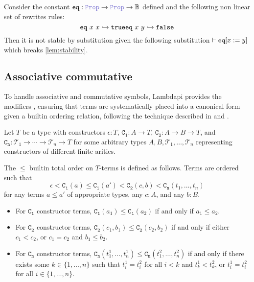 \begin{example}
Consider the constant $\kw{eq}: \prop \ra \prop \ra \B$ defined  and the following non linear set of rewrites rules:
\[
    \texttt{\upshape{eq}}~x~x \hookrightarrow \texttt{\upshape{true}}\\
    \texttt{\upshape{eq}}~x~y \hookrightarrow \texttt{\upshape{false}}
\]
Then it is not stable by substitution given the following substitution $\vdash\texttt{\upshape{eq}}[x := y]$ which breaks \cref{lem:stability}.
\end{example}

\subsection{Associative commutative}

To handle associative and commutative symbols, Lambdapi provides the modifiers ,
ensuring that terms are systematically placed into a canonical form given a builtin ordering relation, following the technique described in \cite{ACorigin} and \cite[\S 5]{univAC}.

\begin{definition}\label{def:builtin-order-relation}
Let $T$ be a type with constructors $\epsilon : T$, $\mathtt{C_1} : A \to T$, $\mathtt{C_2} : A \to B \to T$, and $\mathtt{C_n} : \mathcal{T}_1 \to \cdots \to \mathcal{T}_n \to T$ for some arbitrary types $A, B, \mathcal{T}_1, \ldots, \mathcal{T}_n$ representing constructors of different finite arities.

The $\leq$ builtin total order on $T$-terms is defined as follows. Terms are ordered such that
\[
  \epsilon < \mathtt{C_1}(a) \leq \mathtt{C_1}(a') < \mathtt{C_2}(c, b) < \mathtt{C_n}(t_1, \ldots, t_n)
\]
for any terms $a \leq a'$ of appropriate types, any $c : A$, and any $b : B$.

\begin{itemize}
\item For $\mathtt{C_1}$ constructor terms, $\mathtt{C_1}(a_1) \leq \mathtt{C_1}(a_2)$ if and only if $a_1 \leq a_2$.

  \item For $\mathtt{C_2}$ constructor terms, $\mathtt{C_2}(c_1, b_1) \leq \mathtt{C_2}(c_2, b_2)$ if and only if either $c_1 < c_2$, or $c_1 = c_2$ and $b_1 \leq b_2$.

  \item For $\mathtt{C_n}$ constructor terms, $\mathtt{C_n}(t_1^{1}, \ldots, t_n^{1}) \leq \mathtt{C_n}(t_1^{2}, \ldots, t_n^{2})$ if and only if there exists some $k \in \{1, \ldots, n\}$ such that $t_i^{1} = t_i^{2}$ for all $i < k$ and $t_k^{1} < t_k^{2}$, or $t_i^{1} = t_i^{2}$ for all $i \in \{1, \ldots, n\}$.
\end{itemize}
\end{definition}

